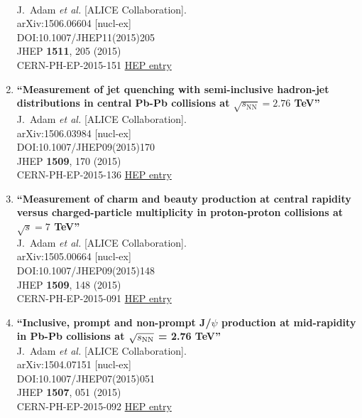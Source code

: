 \begin{enumerate}
  \\{}J.~Adam {\it et al.} [ALICE Collaboration].
  \\{}arXiv:1506.06604 [nucl-ex]
  \\{}DOI:10.1007/JHEP11(2015)205
  \\{}JHEP {\bf 1511}, 205 (2015)
  \\{}CERN-PH-EP-2015-151
\href{http://inspirehep.net/record/1377363}{HEP entry}
\item%
{\bf ``Measurement of jet quenching with semi-inclusive hadron-jet distributions in central Pb-Pb collisions at $ \sqrt{s_{\mathrm{NN}}}=2.76 $ TeV''}
  \\{}J.~Adam {\it et al.} [ALICE Collaboration].
  \\{}arXiv:1506.03984 [nucl-ex]
  \\{}DOI:10.1007/JHEP09(2015)170
  \\{}JHEP {\bf 1509}, 170 (2015)
  \\{}CERN-PH-EP-2015-136
\href{http://inspirehep.net/record/1376027}{HEP entry}
\item%
{\bf ``Measurement of charm and beauty production at central rapidity versus charged-particle multiplicity in proton-proton collisions at $ \sqrt{s}=7 $ TeV''}
  \\{}J.~Adam {\it et al.} [ALICE Collaboration].
  \\{}arXiv:1505.00664 [nucl-ex]
  \\{}DOI:10.1007/JHEP09(2015)148
  \\{}JHEP {\bf 1509}, 148 (2015)
  \\{}CERN-PH-EP-2015-091
\href{http://inspirehep.net/record/1366028}{HEP entry}
\item%
{\bf ``Inclusive, prompt and non-prompt J/$\psi$ production at mid-rapidity in Pb-Pb collisions at $\sqrt{s_{\rm NN}}$ = 2.76 TeV''}
  \\{}J.~Adam {\it et al.} [ALICE Collaboration].
  \\{}arXiv:1504.07151 [nucl-ex]
  \\{}DOI:10.1007/JHEP07(2015)051
  \\{}JHEP {\bf 1507}, 051 (2015)
  \\{}CERN-PH-EP-2015-092
\href{http://inspirehep.net/record/1364887}{HEP entry}

\end{enumerate}
